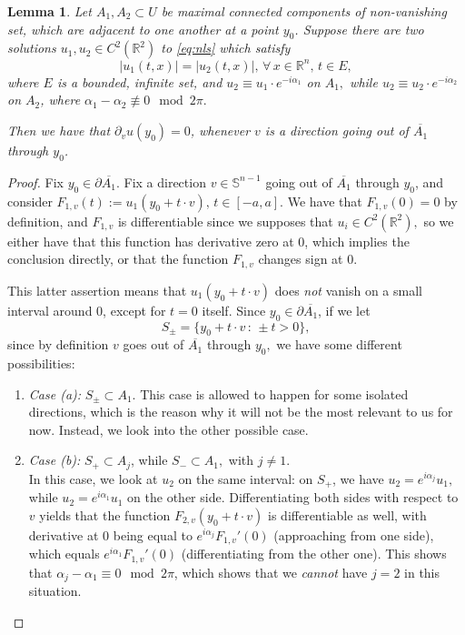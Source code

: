 \documentclass[a4paper,11pt,reqno]{amsart}
\numberwithin{equation}{section}
\theoremstyle{plain} %
\newtheorem{lemma}{Lemma}[section]
\theoremstyle{definition} %
\theoremstyle{remark}
\newcommand{\R}{\mathbb{R}}
\begin{document}
\begin{lemma} Let $A_1, A_2\subset U$ be maximal connected components of non-vanishing set, which are adjacent to one another at a point $y_0$. Suppose there are two solutions $u_1,u_2 \in C^2(\R^2)$ to \eqref{eq:nls} which satisfy 
\[
|u_1(t,x)| = |u_2(t,x)|, \, \forall \, x \in \R^n, \, t \in E,
\]
where $E$ is a bounded, infinite set, and $u_2 \equiv u_1 \cdot e^{-i \alpha_1}$ on $A_1,$ while $u_2 \equiv u_2 \cdot e^{-i \alpha_2}$ on $A_2$, where $\alpha_1 - \alpha_2 \not\equiv 0 \mod 2\pi.$

Then we have that $\partial_v u(y_0) = 0$, whenever $v$ is a direction going out of $\overline{A_1}$ through $y_0$. 
\end{lemma}

\begin{proof} Fix $y_0 \in \partial \overline{A_1}.$ Fix a direction $v \in \mathbb{S}^{n-1}$ going out of $\overline{A_1}$ through $y_0$, and consider $F_{1,v}(t) := u_1(y_0 + t \cdot v), \, t \in [-a,a].$ We have that $F_{1,v}(0) = 0$ by definition, and $F_{1,v}$ is differentiable since we supposes that $u_i \in C^2(\R^2),$ so we either have that this function has derivative zero at $0$, which implies the conclusion directly, or that the function $F_{1,v}$ changes sign at $0$. 

This latter assertion means that $u_1(y_0 + t \cdot v)$ does \emph{not} vanish on a small interval around $0$, except for $t=0$ itself. Since $y_0 \in \partial \overline{A_1}$, if we let 
\[
S_{\pm} = \{ y_0 + t \cdot v \, \colon \, \pm t > 0\},
\]
since by definition $v$ goes out of $\overline{A_1}$ through $y_0,$ we have some different possibilities: 

\begin{enumerate}
    \item[(i)] \textit{Case (a):} $S_{\pm} \subset A_1$. This case is allowed to happen for some isolated directions, which is the reason why it will not be the most relevant to us for now. Instead, we look into the other possible case. \\

    \item[(ii)] \textit{Case (b):} $S_{+} \subset A_j$, while $S_- \subset A_1,$ with $j \neq 1$. \\

    In this case, we look at $u_2$ on the same interval: on $S_+$, we have $u_2 = e^{i\alpha_j } u_1,$ while $u_2 = e^{i\alpha_1} u_1$ on the other side. Differentiating both sides with respect to $v$ yields that the function $F_{2,v}(y_0 + t \cdot v)$ is differentiable as well, with derivative at $0$ being equal to $e^{i\alpha_j} F_{1,v}'(0)$ (approaching from one side), which equals $e^{i\alpha_1} F_{1,v}'(0)$ (differentiating from the other one). This shows that $\alpha_j - \alpha_1 \equiv 0 \mod 2\pi $, which shows that we \emph{cannot} have $j=2$ in this situation.
\end{enumerate}


\end{proof}
\end{document}
